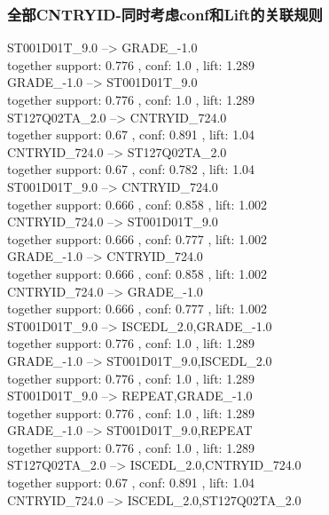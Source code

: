 \documentclass[12pt, a4paper, oneside]{ctexart}
\begin{document}
\subsubsection{全部CNTRYID-同时考虑conf和Lift的关联规则 } 
    ST001D01T\_9.0 --> GRADE\_-1.0 \\
     together support: 0.776 , conf: 1.0 , lift: 1.289\\
   GRADE\_-1.0 --> ST001D01T\_9.0 \\
     together support: 0.776 , conf: 1.0 , lift: 1.289\\
   ST127Q02TA\_2.0 --> CNTRYID\_724.0 \\
    together support: 0.67 , conf: 0.891 , lift: 1.04\\
   CNTRYID\_724.0 --> ST127Q02TA\_2.0 \\
     together support: 0.67 , conf: 0.782 , lift: 1.04\\
   ST001D01T\_9.0 --> CNTRYID\_724.0 \\
     together support: 0.666 , conf: 0.858 , lift: 1.002\\
   CNTRYID\_724.0 --> ST001D01T\_9.0 \\
     together support: 0.666 , conf: 0.777 , lift: 1.002\\
   GRADE\_-1.0 --> CNTRYID\_724.0 \\
     together support: 0.666 , conf: 0.858 , lift: 1.002\\
   CNTRYID\_724.0 --> GRADE\_-1.0\\ 
     together support: 0.666 , conf: 0.777 , lift: 1.002\\
   ST001D01T\_9.0 --> ISCEDL\_2.0,GRADE\_-1.0 \\
     together support: 0.776 , conf: 1.0 , lift: 1.289\\
   GRADE\_-1.0 --> ST001D01T\_9.0,ISCEDL\_2.0 \\
     together support: 0.776 , conf: 1.0 , lift: 1.289\\
   ST001D01T\_9.0 --> REPEAT,GRADE\_-1.0 \\
     together support: 0.776 , conf: 1.0 , lift: 1.289\\
   GRADE\_-1.0 --> ST001D01T\_9.0,REPEAT \\
     together support: 0.776 , conf: 1.0 , lift: 1.289\\
   ST127Q02TA\_2.0 --> ISCEDL\_2.0,CNTRYID\_724.0 \\
    together support: 0.67 , conf: 0.891 , lift: 1.04\\
   CNTRYID\_724.0 --> ISCEDL\_2.0,ST127Q02TA\_2.0 \\
\end{document}
